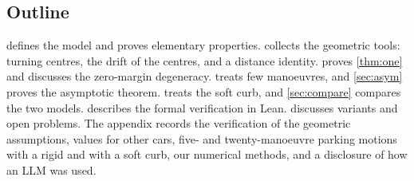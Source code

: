 \subsection{Outline}
 defines the model and proves elementary properties.
 collects the geometric tools: turning centres, the drift of the centres, and a distance identity.
 proves \cref{thm:one} and discusses the zero-margin degeneracy.
 treats few manoeuvres, and \cref{sec:asym} proves the asymptotic theorem.
 treats the soft curb, and \cref{sec:compare} compares the two models.
 describes the formal verification in Lean.
 discusses variants and open problems.
The appendix records the verification of the geometric assumptions, values for other cars, five- and twenty-manoeuvre parking motions with a rigid and with a soft curb, our numerical methods, and a disclosure of how an LLM was used.
